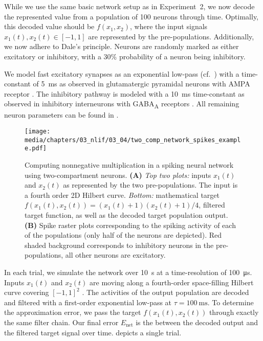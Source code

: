While we use the same basic network setup as in Experiment~2, we now decode the represented value from a population of \num{100} neurons through time.
Optimally, this decoded value should be $f(x_1, x_2)$, where the input signals $x_1(t), x_2(t) \in [-1, 1]$ are represented by the pre-populations.
Additionally, we now adhere to Dale's principle.
Neurons are randomly marked as either excitatory or inhibitory, with a 30\% probability of a neuron being inhibitory.

We model fast excitatory synapses as an exponential low-pass (cf.~) with a time-constant of \SI{5}{\milli\second} as observed in glutamatergic pyramidal neurons with AMPA receptor \citep{jonas1993quantal}.
The inhibitory pathway is modeled with a \SI{10}{\milli\second} time-constant as observed in inhibitory interneurons with GABA\textsubscript{A} receptors \citep{gupta2000organizing}.
All remaining neuron parameters can be found in .


\begin{figure}
	\texttt{[image: media/chapters/03\_nlif/03\_04/two\_comp\_network\_spikes\_example.pdf]}
	\caption[Computing nonnegative multiplication in a spiking neural network using two-compartment LIF neurons]{Computing nonnegative multiplication in a spiking neural network using two-compartment \LIF neurons.
	\textbf{(A)} \emph{Top two plots:} inputs $x_1(t)$ and $x_2(t)$ as represented by the two pre-populations. The input is a fourth order 2D Hilbert curve. \emph{Bottom:} mathematical target $f(x_1(t), x_2(t)) = (x_1(t) + 1) (x_2(t) + 1) / 4$, filtered target function, as well as the decoded target population output.
	\textbf{(B)} Spike raster plots corresponding to the spiking activity of each of the populations (only half of the neurons are depicted). Red shaded background corresponds to inhibitory neurons in the pre-populations, all other neurons are excitatory.}
	\label{fig:two_comp_lif_spiking_example}
\end{figure}

In each trial, we simulate the network over \SI{10}{\second} at a time-resolution of \SI{100}{\micro\second}.
Inputs $x_1(t)$ and $x_2(t)$ are moving along a fourth-order space-filling Hilbert curve covering $[-1, 1]^2$ \citep{hilbert1891uber}.
The activities of the output population are decoded and filtered with a first-order exponential low-pass at $\tau = \SI{100}{\milli\second}$.
To determine the approximation error, we pass the target $f(x_1(t), x_2(t))$ through exactly the same filter chain.
Our final error $E_\mathrm{net}$ is the \NRMSE between the decoded output and the filtered target signal over time.
 depicts a single trial.

